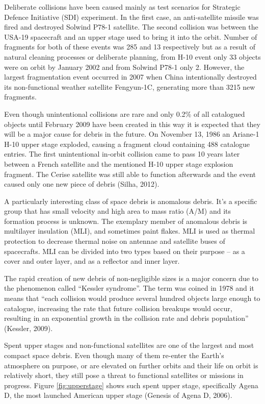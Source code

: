 	Deliberate collisions have been caused mainly as test scenarios for Strategic Defence Initiative (SDI) experiment. In the first case, an anti-satellite missile was fired and destroyed Solwind P78-1 satellite. The second collision was between the USA-19 spacecraft and an upper stage used to bring it into the orbit. Number of fragments for both of these events was 285 and 13 respectively but as a result of natural cleaning processes or deliberate planning, from H-10 event only 33 objects were on orbit by January 2002 and from Solwind P78-1 only 2. However, the largest fragmentation event occurred in 2007 when China intentionally destroyed its non-functional weather satellite Fengyun-1C, generating more than 3215 new fragments. 
	
	Even though unintentional collisions are rare and only 0.2\% of all catalogued objects until February 2009 have been created in this way it is expected that they will be a major cause for debris in the future. On November 13, 1986 an Ariane-1 H-10 upper stage exploded, causing a fragment cloud containing 488 catalogue entries. The first unintentional in-orbit collision came to pass 10 years later between a French satellite and the mentioned H-10 upper stage explosion fragment. The Cerise satellite was still able to function afterwards and the event caused only one new piece of debris (Silha, 2012). 
	
	A particularly interesting class of space debris is anomalous debris. It’s a specific group that has small velocity and high area to mass ratio (A/M) and its formation process is unknown. The exemplary member of anomalous debris is multilayer insulation (MLI), and sometimes paint flakes. MLI is used as thermal protection to decrease thermal noise on antennae and satellite buses of spacecrafts. MLI can be divided into two types based on their purpose – as a cover and outer layer, and as a reflector and inner layer.
	
	The rapid creation of new debris of non-negligible sizes is a major concern due to the phenomenon called “Kessler syndrome”. The term was coined in 1978 and it means that “each collision would produce several hundred objects large enough to catalogue, increasing the rate that future collision breakups would occur, resulting in an exponential growth in the collision rate and debris population” (Kessler, 2009). 
	
	Spent upper stages and non-functional satellites are one of the largest and most compact space debris. Even though many of them re-enter the Earth's atmosphere on purpose, or are elevated on further orbits and their life on orbit is relatively short, they still pose a threat to functional satellites or missions in progress. Figure \ref{fig:upperstage} shows such spent upper stage, specifically Agena D, the most launched American upper stage (Genesis of Agena D, 2006).
	
